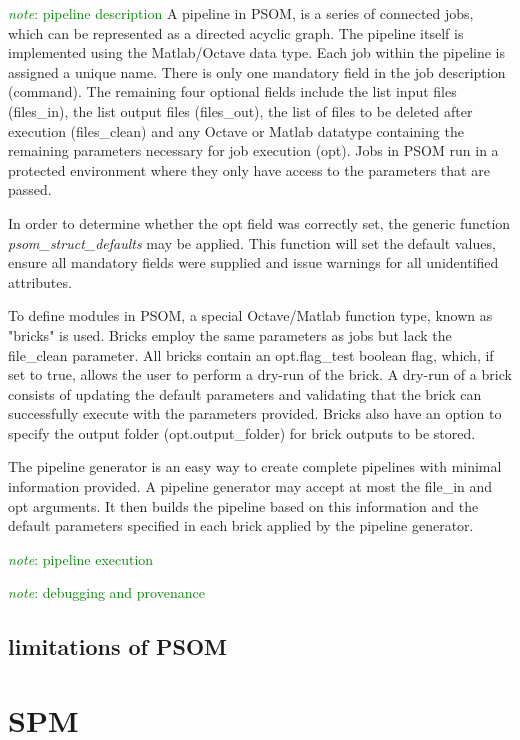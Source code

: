 \documentclass{report}
\newcommand{\note}[1]{\textcolor{green}{\textit{note}: #1}}
\begin{document}
        \note{pipeline description}
        A pipeline in PSOM, is a series of connected jobs, which can be
represented as a directed acyclic graph. The pipeline itself is implemented 
using the Matlab/Octave data type. Each job within the pipeline
is assigned a unique name. There is only one mandatory field in the job
description (command). The remaining four optional fields include the list input
files (files_in), the list output files (files_out), the list of files to be
deleted after execution (files_clean) and any Octave or Matlab datatype
containing the remaining parameters necessary for job execution (opt).
Jobs in PSOM run in a protected environment where they only have access to the
parameters that are passed. 

        In order to determine whether the opt field was correctly set, the
generic function \textit{psom_struct_defaults} may be applied. This function
will set the default values, ensure all mandatory fields were supplied and issue
warnings for all unidentified attributes.

        To define modules in PSOM, a special Octave/Matlab function type, known as "bricks"
is used. Bricks employ the same parameters as jobs but lack the file_clean
parameter. All bricks contain an opt.flag_test boolean flag, which, if set to
true, allows the user to perform a dry-run of the brick. A dry-run of a brick
consists of updating the default parameters and validating that the brick can
successfully execute with the parameters provided. Bricks also have an option to
specify the output folder (opt.output_folder) for brick outputs to be stored.

        The pipeline generator is an easy way to create complete pipelines with
minimal information provided. A pipeline generator may accept at most the
file_in and opt arguments. It then builds the pipeline based on this
information and the default parameters specified in each brick applied by the
pipeline generator.

        \note{pipeline execution}
        


        \note{debugging and provenance}

       
        \subsection{limitations of PSOM}
    \section{SPM} 
\end{document}
